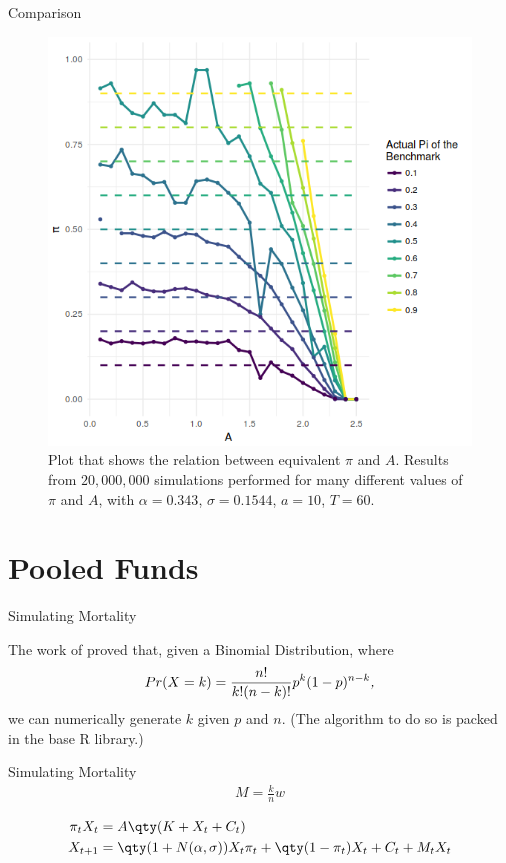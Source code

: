 \documentclass[10pt]{beamer}
\begin{document}
\begin{frame}[fragile]{Comparison}
  \begin{figure}[h]
    \centering
    \includegraphics[scale=0.35]{pi-A-all-pis.png}
    \caption{Plot that shows the relation between equivalent $\pi$ and $A$. Results from $20,000,000$ simulations performed for many different values of $\pi$ and $A$, with $\alpha = 0.343$, $\sigma = 0.1544$, $a = 10$, $T = 60$.}
    \label{fig:es}
  \end{figure}
\end{frame}

\section{Pooled Funds}

\begin{frame}[fragile]{Simulating Mortality}

The work of \cite{a:schmeiser-binomial} proved that, given a Binomial Distribution, where
  \begin{align*}
    Pr(X = k) = \frac{n!}{k!(n-k)!} p^k (1-p)^{n-k} \emph{,}
  \end{align*}
we can numerically generate $k$ given $p$ and $n$. (The algorithm to do so is packed in the base R library.)
\end{frame}

\begin{frame}[fragile]{Simulating Mortality}
  \begin{align*}
    M = \frac{k}{n}w
  \end{align*}

  \begin{align*}
    \pi_t X_t &= A\qty(K + X_t + C_t) \\
    X_{t+1} &= \qty(1 + N(\alpha, \sigma))X_t \pi_t + \qty(1 - \pi_t)X_t + C_t + M_tX_t
  \end{align*}
\end{frame}
\end{document}
